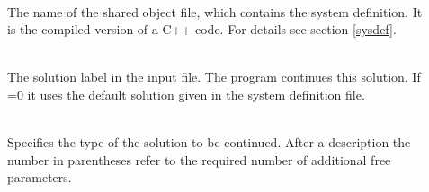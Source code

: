 \documentclass[10pt,a4paper]{ddedoc}
\begin{document}
\begin{description}
\item[] ~\\
The name of the shared object file,
which contains the system definition. It is the compiled version of a C++
code. For details see section \ref{sysdef}.
%
\item[] ~\\
The solution label in the input file. The program continues this
solution. If =0 it uses the default solution given in the system
definition file.
%
\item[] ~\\
Specifies the type of the solution to be continued. After a description the
number in parentheses refer to the required number of additional free
parameters.


\end{description}
\end{document}

